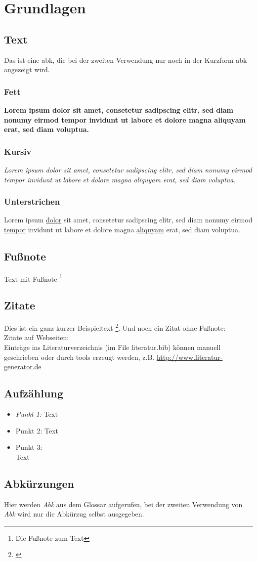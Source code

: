 \chapter{Grundlagen}
\section{Text}
Das ist eine \gls{abk}, die bei der zweiten Verwendung nur noch in der Kurzform \gls{abk} angezeigt wird.

\subsection{Fett}
\textbf{Lorem ipsum dolor sit amet, consetetur sadipscing elitr, sed diam nonumy eirmod tempor invidunt ut labore et dolore magna aliquyam erat, sed diam voluptua.}

\subsection{Kursiv}
\textit{Lorem ipsum dolor sit amet, consetetur sadipscing elitr, sed diam nonumy eirmod tempor invidunt ut labore et dolore magna aliquyam erat, sed diam voluptua.}

\subsection{Unterstrichen}
Lorem ipsum \underline{dolor} sit amet, consetetur sadipscing elitr, sed diam nonumy eirmod \underline{tempor} invidunt ut labore et dolore magna \underline{aliquyam} erat, sed diam voluptua.

\section{Fußnote}

Text mit Fußnote \footnote{Die Fußnote zum Text} 

\section{Zitate}

Dies ist ein ganz kurzer Beispieltext \footnote{\cite{Richter2016}}. Und noch ein Zitat ohne Fußnote: \cite{Jacobsen2017}
\\
Zitate auf Webseiten: \cite{PlutoRed}
\\
Einträge ins Literaturverzeichnis (im File literatur.bib) können manuell geschrieben oder durch tools erzeugt werden, z.B. \url{http://www.literatur-generator.de}

\section{Aufzählung}

\begin{itemize}
\item\textit{Punkt 1:} Text
\item Punkt 2: Text
\item Punkt 3: \\ Text
\end{itemize}

\section{Abkürzungen}
Hier werden \emph{\gls{Abk}} aus dem Glossar aufgerufen, bei der zweiten Verwendung von \emph{\gls{Abk}} wird nur die Abkürzug selbst ausgegeben.
